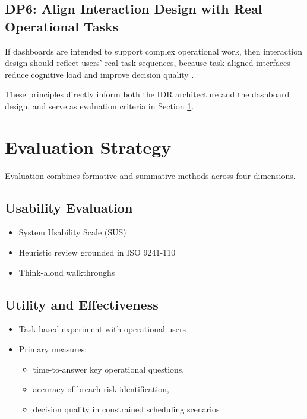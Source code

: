 \subsection*{DP6: Align Interaction Design with Real Operational Tasks}
If dashboards are intended to support complex operational work, then interaction design should reflect users’ real task sequences, because task-aligned interfaces reduce cognitive load and improve decision quality \citep{internationalorganizationforstandardization2020}.

These principles directly inform both the IDR architecture and the dashboard design, and serve as evaluation criteria in Section \ref{EvalStrat}.

\section{Evaluation Strategy} \label{EvalStrat}

Evaluation combines formative and summative methods across four dimensions.

\subsection{Usability Evaluation}
\begin{itemize}
    \item System Usability Scale (SUS)
    \item Heuristic review grounded in ISO 9241-110
    \item Think-aloud walkthroughs
\end{itemize}

\subsection{Utility and Effectiveness}
\begin{itemize}
    \item Task-based experiment with operational users
    \item Primary measures:
    \begin{itemize}
        \item time-to-answer key operational questions,
        \item accuracy of breach-risk identification,
        \item decision quality in constrained scheduling scenarios
    \end{itemize}
\end{itemize}

